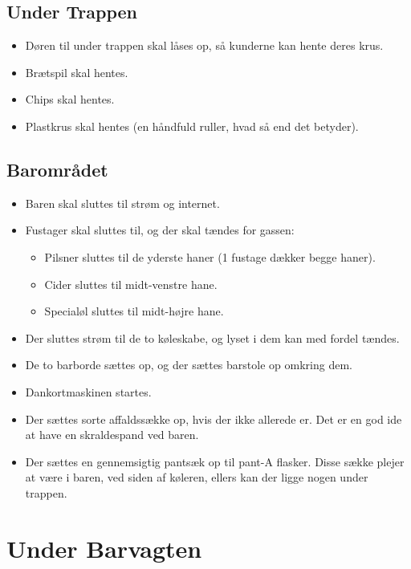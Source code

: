 \subsection{Under Trappen}
\label{sec:pre:under-trappen}

\begin{itemize}
\item Døren til under trappen skal låses op, så kunderne kan hente
  deres krus.
\item Brætspil skal hentes.
\item Chips skal hentes.
\item Plastkrus skal hentes (en håndfuld ruller, hvad så end det
  betyder).
\end{itemize}

\subsection{Barområdet}
\label{sec:pre:baromradet}

\begin{itemize}
\item Baren skal sluttes til strøm og internet.
\item Fustager skal sluttes til, og der skal tændes for
  gassen:
  \begin{itemize}
  \item Pilsner sluttes til de yderste haner (1 fustage dækker begge
    haner).
  \item Cider sluttes til midt-venstre hane.
  \item Specialøl sluttes til midt-højre hane.
  \end{itemize}
\item Der sluttes strøm til de to køleskabe, og lyset i dem kan med
  fordel tændes.
\item De to barborde sættes op, og der sættes barstole op omkring dem.
\item Dankortmaskinen startes.
\item Der sættes sorte affaldssække op, hvis der ikke allerede er. Det
  er en god ide at have en skraldespand ved baren.
\item Der sættes en gennemsigtig pantsæk op til pant-A flasker. Disse
  sække plejer at være i baren, ved siden af køleren, ellers kan der
  ligge nogen under trappen.
\end{itemize}

\section{Under Barvagten}
\label{sec:intra-barvagten}


